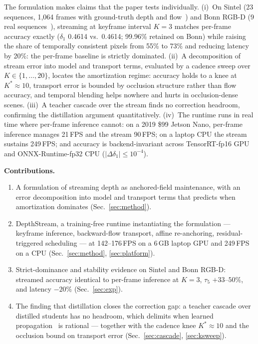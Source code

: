 \documentclass[10pt,twocolumn]{article}
\begin{document}
The formulation makes claims that the paper tests individually. (i)~On
Sintel (23 sequences, 1{,}064 frames with ground-truth depth and
flow~\cite{sintel}) and Bonn RGB-D (9 real sequences~\cite{bonn}), streaming
at keyframe interval $K{=}3$ matches per-frame accuracy exactly
($\delta_1$ 0.4614 vs.\ 0.4614; 99.96\% retained on Bonn) while raising the
share of temporally consistent pixels from 55\% to 73\% and reducing latency
by 20\%: the per-frame baseline is strictly dominated. (ii)~A decomposition
of stream error into model and transport terms, evaluated by a cadence
sweep over $K \in \{1,\dots,20\}$, locates the amortization regime: accuracy
holds to a knee at $K^*{\approx}10$, transport error is bounded by
occlusion structure rather than flow accuracy, and temporal blending helps
nowhere and hurts in occlusion-dense scenes. (iii)~A teacher cascade over
the stream finds no correction headroom, confirming the distillation
argument quantitatively. (iv)~The runtime runs in real time where per-frame
inference cannot: on a 2019 \$99 Jetson Nano, per-frame inference manages
21\,FPS and the stream 90\,FPS; on a laptop CPU the stream sustains
249\,FPS; and accuracy is backend-invariant across TensorRT-fp16 GPU and
ONNX-Runtime-fp32 CPU ($|\Delta\delta_1|\leq10^{-4}$).

\noindent\textbf{Contributions.}
\begin{enumerate}
  \item A formulation of streaming depth as anchored-field maintenance,
  with an error decomposition into model and transport terms that predicts
  when amortization dominates (Sec.~\ref{sec:method}).
  \item DepthStream, a training-free runtime instantiating the formulation
  --- keyframe inference, backward-flow transport, affine re-anchoring,
  residual-triggered scheduling --- at 142--176\,FPS on a 6\,GB laptop GPU
  and 249\,FPS on a CPU (Sec.~\ref{sec:method}, \ref{sec:platform}).
  \item Strict-dominance and stability evidence on Sintel and Bonn RGB-D:
  streamed accuracy identical to per-frame inference at $K{=}3$,
  $\tau_5$ $+33$--$50\%$, and latency $-20\%$ (Sec.~\ref{sec:exp}).
  \item The finding that distillation closes the correction gap: a teacher
  cascade over distilled students has no headroom, which delimits when
  learned propagation~\cite{velodepth} is rational --- together with the
  cadence knee $K^*{\approx}10$ and the occlusion bound on transport error
  (Sec.~\ref{sec:cascade}, \ref{sec:ksweep}).
\end{enumerate}
\end{document}
